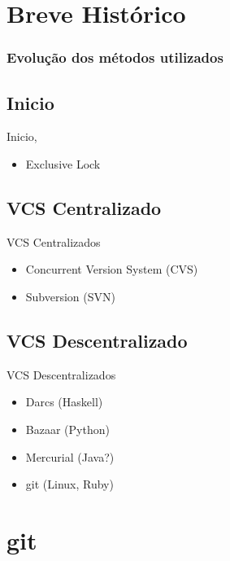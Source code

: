 \documentclass{beamer}
\begin{document}
  \section{Breve Histórico}
  \begin{frame}
    \frametitle{Evolução dos métodos utilizados}
    \subsection{Inicio}
    Inicio, 
    \begin{itemize}
      \item Exclusive Lock
    \end{itemize}

    \subsection{VCS Centralizado}
    VCS Centralizados
    \begin{itemize}
      \item Concurrent Version System (CVS)
      \item Subversion (SVN)
    \end{itemize}
    \subsection{VCS Descentralizado}
    VCS Descentralizados
    \begin{itemize}
      \item Darcs (Haskell)
      \item Bazaar (Python)
      \item Mercurial (Java?)
      \item git (Linux, Ruby)
    \end{itemize}
    \vfill
  \end{frame}

  \section{git}
\end{document}
